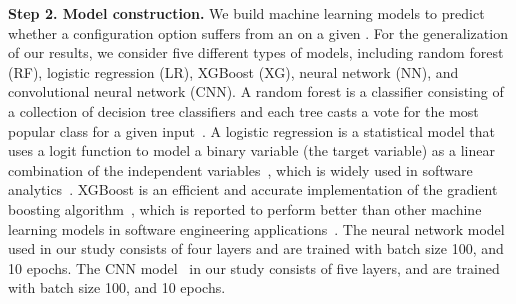 \noindent\textbf{Step 2. Model construction.}
We build %
machine learning models to predict whether a configuration option suffers from an \inconsistent on a given \instance. %
For the generalization of our results, we consider five different types of models, including random forest (RF), logistic regression (LR), XGBoost (XG), neural network (NN), and convolutional neural network (CNN). %
A random forest is a classifier consisting of a collection of decision tree classifiers and each tree casts a vote for the most popular class for a given input~\cite{breiman2001random}. 
A logistic regression is a statistical model that uses a logit function to model a binary variable (the target variable) as a linear combination of the independent variables~\cite{hosmer2013applied}, which is widely used in software analytics~\cite{tantithamthavorn2018impact,shang2015automated}. 
XGBoost is an efficient and accurate implementation of the gradient boosting algorithm~\cite{chen2016xgboost}, which is reported to perform better than other machine learning models in software engineering applications~\cite{Liao2020LogPerfReg}.
The neural network model~\cite{DBLP:journals/jmlr/GlorotBB11} used in our study consists of four layers and are trained with batch size 100, and 10 epochs.
The CNN model~\cite{DBLP:journals/tnn/LawrenceGTB97} in our study consists of five layers, and are trained with batch size 100, and 10 epochs.



